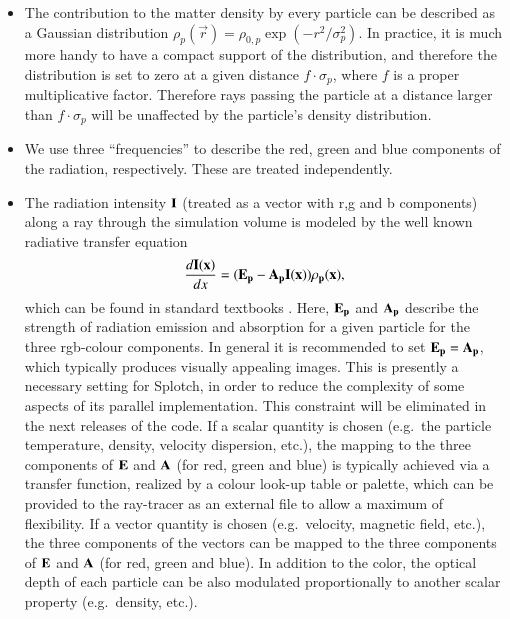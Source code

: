 \documentclass[1p,times]{elsarticle}
\begin{document}
\begin{itemize}
\item
The contribution to the matter density by every particle can
be described as a Gaussian distribution 
$\rho_p(\vec r)=\rho_{0,p}\exp(-r^2/\sigma_p^2)$.
In practice, it is much more handy to have a compact support of the
distribution, and therefore the distribution is set to zero at a given
distance $f\cdot\sigma_p$, where $f$ is a proper multiplicative factor. 
Therefore rays passing
the particle at a distance larger than $f\cdot\sigma_p$ will be
unaffected by the particle's density distribution.

\item 
We use three ``frequencies'' to describe the red, green and blue
components of the radiation, respectively. These are treated independently.

\item
The radiation intensity $\bf{I}$ (treated 
as a vector with r,g and b components) along a ray through the simulation
volume is modeled by the well known radiative transfer equation
\begin{equation}
\frac{d\bf{I}(x)}{dx}=(\bf{E}_p-\bf{A}_p\bf{I}(x))\rho_p(x),
\end{equation}
which can be found in standard textbooks \cite{1991par..book.....S}.
Here, $\bf{E}_p$ and $\bf{A}_p$ describe the strength of radiation emission and absorption
for a given particle for the three rgb-colour components. In general it is recommended to
set $\bf{E}_p=\bf{A}_p$, which typically produces visually appealing images. This is presently a 
necessary setting for Splotch, in order to reduce the complexity of some aspects of its parallel
implementation. This constraint will be eliminated in the next releases of the code.
If a scalar quantity is chosen (e.g.\ the particle temperature,
density, velocity dispersion, etc.), the mapping to the three components of $\bf{E}$ and $\bf{A}$ (for red, green and blue)
is typically achieved via a transfer function, realized by a colour look-up table or palette, which can
be provided to the ray-tracer as an external file to allow a maximum of flexibility. If a
vector quantity is chosen (e.g.\ velocity, magnetic field, etc.), the three components of the vectors
can be mapped to the three components of $\bf{E}$ and $\bf{A}$ (for red, green and blue). In addition 
to the color, the optical depth of each particle can be also modulated proportionally to another
scalar property (e.g.\ density, etc.).
\end{itemize}
\end{document}
